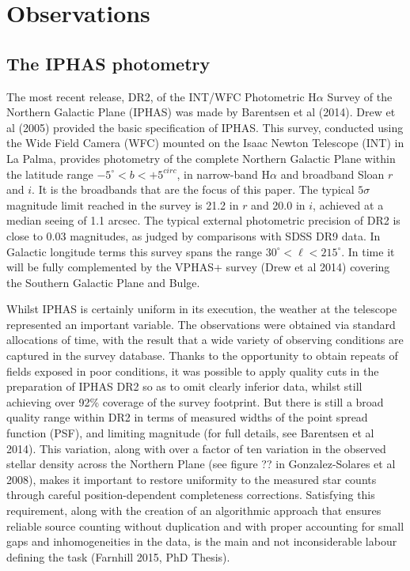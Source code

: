 \documentclass[a4paper,useAMS,usenatbib]{mn2e}
\begin{document}
\section[]{Observations}

\subsection{The IPHAS photometry}

The most recent release, DR2, of the INT/WFC Photometric H$\alpha$ Survey of the Northern Galactic Plane (IPHAS) was made by 
Barentsen et al (2014).   Drew et al (2005) provided the basic specification of IPHAS.  This survey, conducted using the Wide Field
Camera (WFC) mounted on the Isaac Newton Telescope (INT) in La Palma, provides photometry of the complete Northern Galactic Plane within 
the latitude range $-5^{\circ} < b < +5^{circ}$, in narrow-band H$\alpha$ and broadband Sloan $r$ and $i$.  It is the 
broadbands that are the focus of this paper.  The typical $5\sigma$ magnitude limit reached in the survey is 21.2 in $r$ and 
20.0 in $i$, achieved at a median seeing of 1.1 arcsec.  The typical external photometric precision of DR2 is close to 0.03 
magnitudes, as judged by comparisons with SDSS DR9 data.  In Galactic longitude terms this survey spans the range
$30^{\circ} < \ell < 215^{\circ}$.  In time it will be fully complemented by the VPHAS+ survey (Drew et al 2014) covering 
the Southern Galactic Plane and Bulge.  

Whilst IPHAS is certainly uniform in its execution, the weather at the telescope represented an important variable.  The observations
were obtained via standard allocations of time, with the result that a wide variety of observing conditions are captured in the 
survey database.  Thanks to the opportunity to obtain repeats of fields exposed in poor conditions, it was possible to apply 
quality cuts in the preparation of IPHAS DR2 so as to omit clearly inferior data, whilst still achieving over 92\% coverage of 
the survey footprint.  But there is still a broad quality range within DR2 in terms of measured widths of the point spread 
function (PSF), and limiting magnitude (for full details, see Barentsen et al 2014).  This variation, along with over a factor
of ten variation in the observed stellar density across the Northern Plane (see figure ?? in Gonzalez-Solares et al 2008), 
makes it important to restore uniformity to the measured star counts through careful position-dependent completeness 
corrections.  Satisfying this requirement, along with the creation of an algorithmic approach that ensures reliable source 
counting without duplication and with proper accounting for small gaps and inhomogeneities in the data, is the main and 
not inconsiderable labour defining the task (Farnhill 2015, PhD Thesis).
\end{document}
